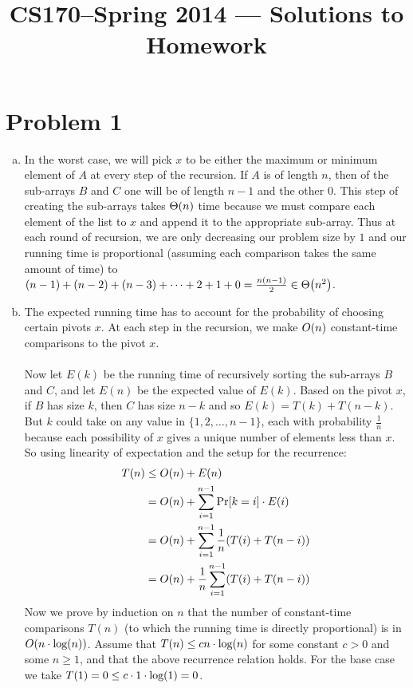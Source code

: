 \documentclass[11pt]{article}
\title{CS170--Spring 2014 --- Solutions to Homework \Homework}
\author{\Name}
\newcounter{problemnumber}
\let\origleft\left
\let\origright\right
\renewcommand{\left}{\mathopen{}\mathclose\bgroup\origleft}
\renewcommand{\right}{\aftergroup\egroup\origright}
\newcommand{\p}[1]{\left(#1\right)}
\renewcommand{\log}[1]{\text{log}\p{#1}}
\newcommand{\BigOh}[1]{O\p{#1}}
\newcommand{\BigTheta}[1]{\Theta\p{#1}}
\begin{document}
\maketitle
\setcounter{problemnumber}{0}

\section*{Problem 1}
\begin{enumerate}[(a)]
\item In the worst case, we will pick $x$ to be either the maximum or minimum element of $A$ at every step of the recursion. If $A$ is of length $n$, then of the sub-arrays $B$ and $C$ one will be of length $n-1$ and the other $0$. This step of creating the sub-arrays takes $\BigTheta{n}$ time because we must compare each element of the list to $x$ and append it to the appropriate sub-array. Thus at each round of recursion, we are only decreasing our problem size by $1$ and our running time is proportional (assuming each comparison takes the same amount of time) to $(n-1)+(n-2)+(n-3)+\cdots+2+1+0 = \frac{n(n-1)}2\in \BigTheta{n^2}$.
\item The expected running time has to account for the probability of choosing certain pivots $x$. At each step in the recursion, we make $\BigOh{n}$ constant-time comparisons to the pivot $x$. \\\\
Now let $E(k)$ be the running time of recursively sorting the sub-arrays $B$ and $C$, and let $E(n)$ be the expected value of $E(k)$. Based on the pivot $x$, if $B$ has size $k$, then $C$ has size $n-k$ and so $E(k) = T(k)+T(n-k)$. But $k$ could take on any value in $\{1,2,\ldots,n-1\}$, each with probability $\frac 1n$ because each possibility of $x$ gives a unique number of elements less than $x$. So using linearity of expectation and the setup for the recurrence:
\begin{align*}
T(n) &\leq \BigOh{n} + E(n) \\
&= \BigOh{n} + \sum_{i=1}^{n-1} \Pr[k=i]\cdot E(i) \\
&= \BigOh{n} + \sum_{i=1}^{n-1} \frac 1n (T(i)+T(n-i)) \\
&= \BigOh{n} + \frac 1n \sum_{i=1}^{n-1} (T(i)+T(n-i))
\end{align*}
Now we prove by induction on $n$ that the number of constant-time comparisons $T(n)$ (to which the running time is directly proportional) is in $\BigOh{n\cdot\log n}$. Assume that $T(n) \leq cn\cdot\log n$ for some constant $c>0$ and some $n\geq 1$, and that the above recurrence relation holds. For the base case we take $T(1) =0 \leq  c\cdot 1\cdot\log 1 = 0$. \\\\

\end{enumerate}
\end{document}
